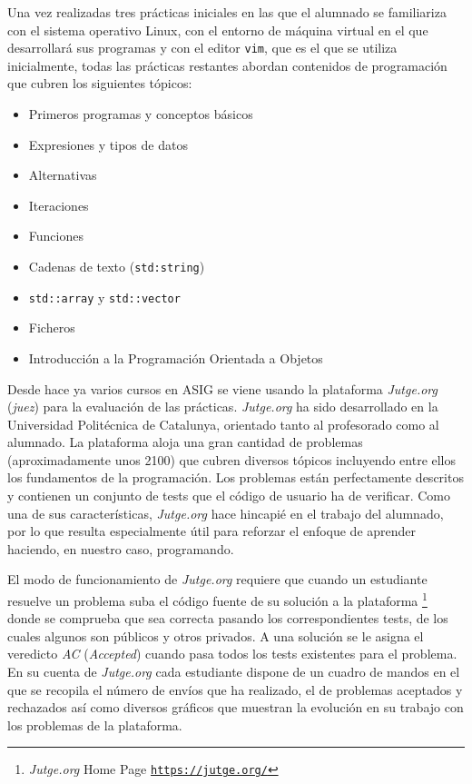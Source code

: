 \documentclass[twocolumn,twoside,a4paper, 10pt]{article}
\newcommand{\jutge}{\textit{Jutge.org}{}}           %
\begin{document}
Una vez realizadas tres prácticas iniciales en las que el alumnado se familiariza con el sistema operativo
Linux, con el entorno de máquina virtual en el que desarrollará sus programas y con el editor \texttt{vim}, 
que es el que se utiliza inicialmente, todas las prácticas restantes abordan contenidos de programación que
cubren los siguientes tópicos:
\begin{itemize}
  \item Primeros programas y conceptos básicos
  \item Expresiones y tipos de datos
  \item Alternativas
  \item Iteraciones
  \item Funciones
  \item Cadenas de texto (\texttt{std:string})
  \item \texttt{std::array} y \texttt{std::vector}
  \item Ficheros
  \item Introducción a la Programación Orientada a Objetos
\end{itemize}

Desde hace ya varios cursos en ASIG se viene usando la plataforma \jutge{} (\textit{juez}) 
\cite{Petit:Jutge:2018} para la evaluación de las prácticas.
\jutge{} ha sido desarrollado en la Universidad Politécnica de Catalunya, orientado tanto al profesorado 
como al alumnado.
La plataforma aloja una gran cantidad de problemas (aproximadamente unos 2100) que cubren diversos
tópicos incluyendo entre ellos los fundamentos de la programación.
Los problemas están perfectamente descritos y contienen un conjunto de tests que el código de usuario ha de
verificar.
Como una de sus características, \jutge{} hace hincapié en el trabajo del alumnado, por lo que 
resulta especialmente útil para reforzar el enfoque de aprender haciendo, en nuestro caso, programando.

El modo de funcionamiento de \jutge{} requiere que cuando un estudiante resuelve un problema suba el código
fuente de su solución a la plataforma
\footnote{\textit{Jutge.org} Home Page \href{https://jutge.org/}{\scriptsize{\texttt{https://jutge.org/}}}}
donde se comprueba que sea correcta pasando los correspondientes tests, de los cuales algunos son públicos
y otros privados.
A una solución se le asigna el veredicto \textit{AC} (\textit{Accepted}) cuando pasa todos los tests existentes para el problema.
En su cuenta de \jutge{} cada estudiante dispone de un cuadro de mandos en el que se recopila el número de
envíos que ha realizado, el de problemas aceptados y rechazados así como diversos gráficos que muestran la
evolución en su trabajo con los problemas de la plataforma.
\end{document}
